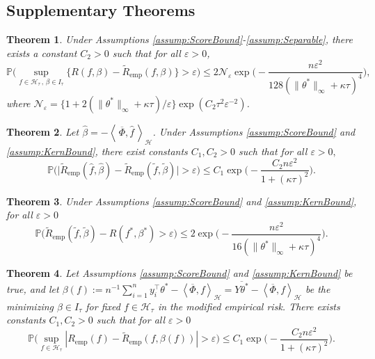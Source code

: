 \documentclass[twoside, onecolumn]{article}
\def\varep{\varepsilon}
\def\Hcal{\mathcal{H}}
\def\Hcal{\mathcal{H}}
\newtheorem{theorem}{Theorem}
\begin{document}
\subsection{Supplementary Theorems}

\begin{theorem}\label{thm:SymBound}
Under Assumptions \ref{assump:ScoreBound}-\ref{assump:Separable}, there exists a constant $C_2 > 0$ such that for all $\varep>0$, 
$$
\mathbb{P}\Big(\sup_{f\in \mathcal{H}_\tau\,,\, \beta\in I_\tau}\{R(f,\beta)-\widetilde R_{\text{emp}}(f, \beta)\}>\varep\Big)
\leq  2\mathcal{N}_{\varep}\exp\Big(-  \frac{n\varepsilon^2}{128(\|\theta^*\|_\infty+\kappa \tau)^{4}}\Big),
$$
where $\mathcal{N}_{\varep}=\{1+2(\|\theta^*\|_\infty+\kappa\tau)/\varep\} 
\exp( C_2\tau^2 \varepsilon^{-2})$.
\end{theorem}

\begin{theorem}\label{thm:ModRiskDiffConverge}
 Let $\widehat{\beta}=-\left<\,\overline{\Phi}, \widehat{f}\,\right>_\Hcal$. Under Assumptions \ref{assump:ScoreBound} and \ref{assump:KernBound}, there exist constants $C_1, C_2>0$ such that for all $\varep>0,$
 \[
\mathbb{P}\Big(\Big| \widetilde{R}_{\text{emp}}(\widehat{f}, \widehat{\beta})-\widetilde{R}_{\text{emp}}(\widetilde{f}, \widetilde{\beta})\Big|>\varep\Big) \leq C_1\exp\Big( -\frac{C_2n \varepsilon^2}{1+(\kappa\tau)^2}\Big).
 \]
\end{theorem}


\begin{theorem}\label{thm:ModConsistency}
Under Assumptions \ref{assump:ScoreBound} and \ref{assump:KernBound}, for all $\varep>0$
$$
\mathbb{P}\Big(\widetilde R_{\text{emp}}(\widetilde f, \widetilde \beta)-R(f^\ast, \beta^\ast) >\varep \Big)
\leq 2\exp\Big( -\frac{n\varepsilon^2}{16(\|\theta^*\|_\infty+\kappa\tau)^{4}}\Big).
$$
\end{theorem}

\begin{theorem}\label{thm:DifferenceRiskSupConverge}
Let Assumptions \ref{assump:ScoreBound} and \ref{assump:KernBound} be true, and let $\beta(f):=n^{-1}\sum_{i=1}^ny_i^{\top}\theta^*-\left<\overline{\Phi},f\right>_\Hcal= \overline{Y\theta^*} - \left<\overline{\Phi},f\right>_\Hcal$ be the minimizing $\beta\in I_\tau$ for fixed $f\in \mathcal{H}_{\tau}$ in the modified empirical risk. There exists constants $C_1,C_2>0$ such that for all $\varep>0$
\[
\mathbb{P}\Big(\sup_{f\in \mathcal{H}_\tau} |R_{\text{emp}}(f)-\widetilde{R}_{\text{emp}}(f, \beta(f))|>\varepsilon \Big)\leq C_1 \exp\Big( -\frac{C_2n \varepsilon^2}{1+(\kappa\tau)^2}\Big).
\]
\end{theorem}
\end{document}
